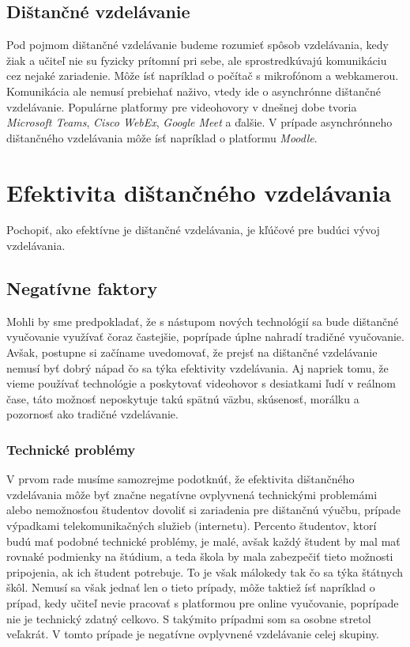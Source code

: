 \documentclass[10pt,twoside,slovak,a4paper]{article}
\begin{document}
\subsection{Dištančné vzdelávanie}
Pod pojmom dištančné vzdelávanie budeme rozumieť spôsob vzdelávania, kedy žiak a učiteľ nie su fyzicky prítomní pri sebe, ale sprostredkúvajú komunikáciu cez nejaké zariadenie. Môže ísť napríklad o počítač s mikrofónom a webkamerou. Komunikácia ale nemusí prebiehať naživo, vtedy ide o asynchrónne dištančné vzdelávanie. Populárne platformy pre videohovory v dnešnej dobe tvoria \textit{Microsoft Teams}, \textit{Cisco WebEx}, \textit{Google Meet} a ďalšie. V prípade asynchrónneho dištančného vzdelávania môže ísť napríklad o platformu \textit{Moodle}.

\section{Efektivita dištančného vzdelávania} \label{efektivita}
Pochopiť, ako efektívne je dištančné vzdelávania, je kľúčové pre budúci vývoj vzdelávania.


\subsection{Negatívne faktory}
Mohli by sme predpokladať, že s nástupom nových technológií sa bude dištančné vyučovanie využívať čoraz častejšie, poprípade úplne nahradí tradičné vyučovanie. Avšak, postupne si začíname uvedomovať, že prejsť na dištančné vzdelávanie nemusí byť dobrý nápad čo sa týka efektivity vzdelávania. Aj napriek tomu, že vieme používať technológie a poskytovať videohovor s desiatkami ľudí v reálnom čase, táto možnosť neposkytuje takú spätnú väzbu, skúsenosť, morálku a pozornosť ako tradičné vzdelávanie\cite{Wang:Investigation}\cite{Weidlich:Impact}.

\subsubsection{Technické problémy}
V prvom rade musíme samozrejme podotknúť, že efektivita dištančného vzdelávania môže byť značne negatívne ovplyvnená technickými problemámi alebo nemožnosťou študentov dovoliť si zariadenia pre dištančnú výučbu, prípade výpadkami telekomunikačných služieb (internetu). Percento študentov, ktorí budú mať podobné technické problémy, je malé, avšak každý študent by mal mať rovnaké podmienky na štúdium, a teda škola by mala zabezpečiť tieto možnosti pripojenia, ak ich študent potrebuje. To je však málokedy tak čo sa týka štátnych škôl.
Nemusí sa však jednať len o tieto prípady, môže taktiež ísť napríklad o prípad, kedy učiteľ nevie pracovať s platformou pre online vyučovanie, poprípade nie je technický zdatný celkovo. S takýmito prípadmi som sa osobne stretol veľakrát. V tomto prípade je negatívne ovplyvnené vzdelávanie celej skupiny.
\end{document}
